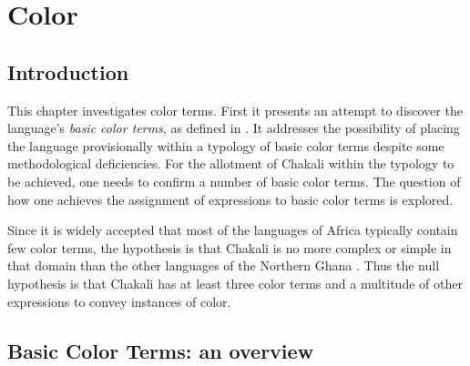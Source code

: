 \chapter{Color}
\label{sec:COL-chap}

\section{Introduction}
\label{intro}

This chapter investigates  color terms. First it presents  an attempt to
discover the language's  \textit{basic color terms}, as  defined in
\cite{Berl69}. It addresses  the possibility of placing the language
provisionally 
within a typology of basic color terms despite some methodological
deficiencies.   For the allotment of Chakali within the typology to be achieved,
one needs to confirm a number of basic color terms. The question of how one
achieves the assignment of expressions to basic color terms is explored. 

Since it is widely accepted that most of the languages of Africa typically
contain few color terms, the hypothesis is  that Chakali is no more complex or
simple in that domain than the other languages of the Northern Ghana
\citep{Nade05}. Thus the null hypothesis is that Chakali  has at least three
color terms and a multitude of other expressions to convey instances of color.  








 
\section{Basic Color Terms: an overview}
\label{sec:basiccolor}

